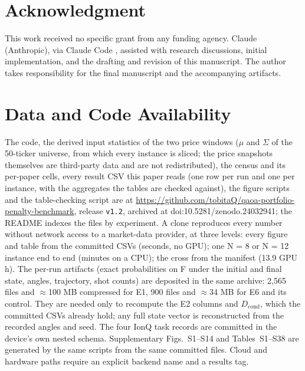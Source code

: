 \documentclass{ieeeaccess}
\begin{document}
\section*{Acknowledgment}


This work received no specific grant from any funding agency. Claude (Anthropic), via Claude Code \cite{ref49}, assisted with research discussions, initial implementation, and the drafting and revision of this manuscript. The author takes responsibility for the final manuscript and the accompanying artifacts.


\section*{Data and Code Availability}

The code, the derived input statistics of the two price windows ($\mu$ and $\Sigma$ of the 50-ticker universe, from which every instance is sliced; the price snapshots themselves are third-party data and are not redistributed), the census and its per-paper cells, every result CSV this paper reads (one row per run and one per instance, with the aggregates the tables are checked against), the figure scripts and the table-checking script are at \url{https://github.com/tobitaQ/qaoa-portfolio-penalty-benchmark}, release \texttt{v1.2}, archived at doi:10.5281/zenodo.24032941; the README indexes the files by experiment. A clone reproduces every number without network access to a market-data provider, at three levels: every figure and table from the committed CSVs (seconds, no GPU); one N = 8 or N = 12 instance end to end (minutes on a CPU); the cross from the manifest (13.9 GPU h). The per-run artifacts (exact probabilities on F under the initial and final state, angles, trajectory, shot counts) are deposited in the same archive: 2,565 files and $\approx$100 MB compressed for E1, 900 files and $\approx$34 MB for E6 and its control. They are needed only to recompute the E2 columns and $D_{\mathrm{cond}}$, which the committed CSVs already hold; any full state vector is reconstructed from the recorded angles and seed. The four IonQ task records are committed in the device's own nested schema. Supplementary Figs.~S1--S14 and Tables~S1--S38 are generated by the same scripts from the same committed files. Cloud and hardware paths require an explicit backend name and a results tag.
\end{document}
